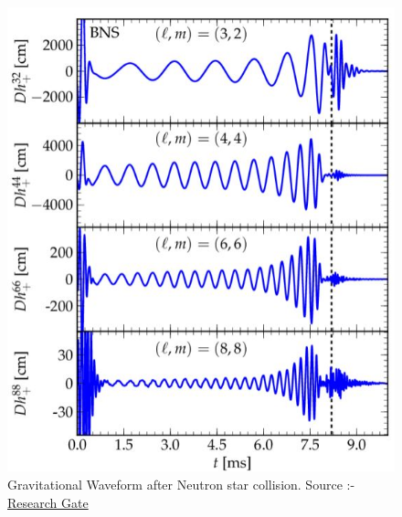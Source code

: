 \begin{figure}[h]
    \centering
    \includegraphics[scale=0.74]{images.tex/WAVEFORM.jpeg}
    \caption{Gravitational Waveform after Neutron star collision. Source :- \href{https://www.researchgate.net/figure/Binary-neutron-stars-GW-modes-m-3-2-4-4-6-6-8-8-of-polarization_fig13_233846764}{Research Gate}}
\end{figure}

\pagebreak
 





























































 